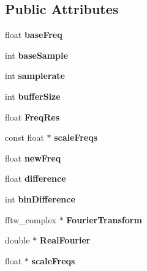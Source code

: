 \subsection*{Public Attributes}
\begin{DoxyCompactItemize}
\item 
\hypertarget{classvocoder_aafcdc7b5f6784b3b55f7c964211c1329}{float {\bfseries base\-Freq}}\label{classvocoder_aafcdc7b5f6784b3b55f7c964211c1329}

\item 
\hypertarget{classvocoder_ab5c7dbce120b438d5a3f60771e8b359e}{int {\bfseries base\-Sample}}\label{classvocoder_ab5c7dbce120b438d5a3f60771e8b359e}

\item 
\hypertarget{classvocoder_a1cc2c8e543b6bdcb79634bff13bf23fd}{int {\bfseries samplerate}}\label{classvocoder_a1cc2c8e543b6bdcb79634bff13bf23fd}

\item 
\hypertarget{classvocoder_a33f8486a4d2962a9f28a855cb7a55e5d}{int {\bfseries buffer\-Size}}\label{classvocoder_a33f8486a4d2962a9f28a855cb7a55e5d}

\item 
\hypertarget{classvocoder_a7e4963de3417d77dd67b5d2d4098b4bf}{float {\bfseries Freq\-Res}}\label{classvocoder_a7e4963de3417d77dd67b5d2d4098b4bf}

\item 
\hypertarget{classvocoder_ae08ca4fc0d5b20a84ebe720adf9e1906}{const float $\ast$ {\bfseries scale\-Freqs}}\label{classvocoder_ae08ca4fc0d5b20a84ebe720adf9e1906}

\item 
\hypertarget{classvocoder_aeb2b2f60f0f665a0ada7432a698e8cbb}{float {\bfseries new\-Freq}}\label{classvocoder_aeb2b2f60f0f665a0ada7432a698e8cbb}

\item 
\hypertarget{classvocoder_a3e465de83503fc072b5877cc370b9158}{float {\bfseries difference}}\label{classvocoder_a3e465de83503fc072b5877cc370b9158}

\item 
\hypertarget{classvocoder_ae82a9e8adea02301434f03ac01c61720}{int {\bfseries bin\-Difference}}\label{classvocoder_ae82a9e8adea02301434f03ac01c61720}

\item 
\hypertarget{classvocoder_ac249f700b1708bf7cd07e01b705a2426}{fftw\-\_\-complex $\ast$ {\bfseries Fourier\-Transform}}\label{classvocoder_ac249f700b1708bf7cd07e01b705a2426}

\item 
\hypertarget{classvocoder_aa7b3406cd1595cc8b23c34a4364bde4d}{double $\ast$ {\bfseries Real\-Fourier}}\label{classvocoder_aa7b3406cd1595cc8b23c34a4364bde4d}

\item 
\hypertarget{classvocoder_a723e95fc1b499d823033c6acf561b1ea}{float $\ast$ {\bfseries scale\-Freqs}}\label{classvocoder_a723e95fc1b499d823033c6acf561b1ea}

\end{DoxyCompactItemize}


